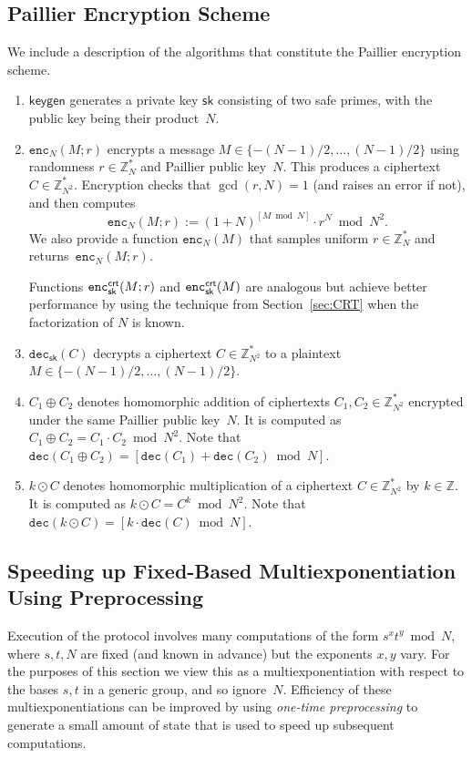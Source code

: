 \documentclass[11pt]{article}
\newcommand{\enc}{\ensuremath{\mathtt{enc}}}
\newcommand{\dec}{\ensuremath{\mathtt{dec}}}
\newcommand{\sk}{\textsf{sk}}
\newcommand{\Z}{\mathbb{Z}}
\newcommand{\?}[1]{\stackrel{?}{#1}}
\begin{document}
\subsection{Paillier Encryption Scheme}
We include a description of the algorithms that constitute the Paillier encryption scheme. 
\begin{enumerate}
    \item $\textsf{keygen}$ generates a private key $\sk$ consisting of two safe primes, with the public key being their product~$N$.
    
    
    \item $\enc_N(M; r)$ encrypts a message $M \in \{-(N-1)/2, \ldots,  (N-1)/2\}$ using randomness $r \in \Z_N^*$ and Paillier public key~$N$. This produces a ciphertext $C \in \Z^*_{N^2}$.
Encryption checks that $\gcd(r, N)=1$ (and raises an error if not), and then 
computes
    \[\enc_N(M; r) := (1 + N)^{[M \bmod N]} \cdot r^N \bmod N^2.\] 
    We also provide a function $\enc_N(M)$ that samples uniform $r \in \Z_N^*$ and returns~$\enc_N(M; r)$.

    Functions $\enc^{{\sf crt}}_{\sk}(M;r)$ and $\enc^{{\sf crt}}_{\sk}(M)$ are analogous but achieve better performance by using the technique from Section~\ref{sec:CRT} when the factorization of $N$
    is known.

    \item $\dec_{\sk}(C)$ decrypts a ciphertext $C \in \Z^*_{N^2}$ to a plaintext $M \in \{-(N-1)/2, \ldots,  (N-1)/2\}$.

    \item $C_1 \oplus C_2$ denotes homomorphic addition of ciphertexts $C_1, C_2 \in \Z^*_{N^2}$ encrypted under the same Paillier public key~$N$. It is computed as $C_1 \oplus C_2 = C_1 \cdot C_2 \bmod N^2$. Note that 
$\dec(C_1 \oplus C_2) = [\dec(C_1) + \dec(C_2) \bmod N]$. 

    

    \item $k \odot C$ denotes homomorphic multiplication of a ciphertext $C \in \Z^*_{N^2}$ by $k \in \Z$. It is computed as $k \odot C = C^k \bmod N^2$. Note that $\dec(k \odot C) = [k \cdot \dec(C) \bmod N]$.

    
\end{enumerate}

\subsection{Speeding up Fixed-Based Multiexponentiation Using Preprocessing}
\label{sec:multiexp}
Execution of the protocol involves many computations of the form $s^x t^y \bmod N$, where $s, t, N$ are fixed (and known in advance) but the exponents $x, y$ vary. 
For the purposes of this section we view this as a multiexponentiation with respect to the bases $s, t$ in a generic group, and so ignore~$N$.
Efficiency of these multiexponentiations can be improved by using \emph{one-time preprocessing} to generate a small amount of state that is used to speed up subsequent computations.
\end{document}
